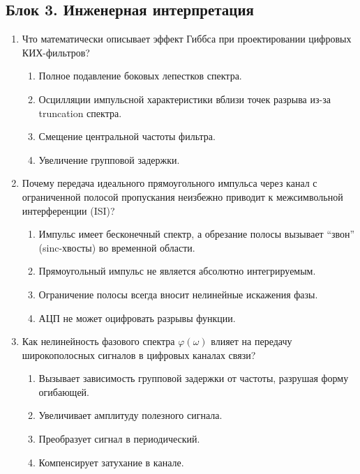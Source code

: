 \documentclass[12pt,a4paper]{article}
\begin{document}
\subsection*{Блок 3. Инженерная интерпретация}
\begin{enumerate}[label=\textbf{3.\arabic*.}]
    \item Что математически описывает эффект Гиббса при проектировании цифровых КИХ-фильтров?
    \begin{enumerate}[label=\alph*)]
        \item Полное подавление боковых лепестков спектра.
        \item Осцилляции импульсной характеристики вблизи точек разрыва из-за truncation спектра.
        \item Смещение центральной частоты фильтра.
        \item Увеличение групповой задержки.
    \end{enumerate}

    \item Почему передача идеального прямоугольного импульса через канал с ограниченной полосой пропускания неизбежно приводит к межсимвольной интерференции (ISI)?
    \begin{enumerate}[label=\alph*)]
        \item Импульс имеет бесконечный спектр, а обрезание полосы вызывает ``звон'' (sinc-хвосты) во временной области.
        \item Прямоугольный импульс не является абсолютно интегрируемым.
        \item Ограничение полосы всегда вносит нелинейные искажения фазы.
        \item АЦП не может оцифровать разрывы функции.
    \end{enumerate}

    \item Как нелинейность фазового спектра $\varphi(\omega)$ влияет на передачу широкополосных сигналов в цифровых каналах связи?
    \begin{enumerate}[label=\alph*)]
        \item Вызывает зависимость групповой задержки от частоты, разрушая форму огибающей.
        \item Увеличивает амплитуду полезного сигнала.
        \item Преобразует сигнал в периодический.
        \item Компенсирует затухание в канале.
    \end{enumerate}


\end{enumerate}
\end{document}
